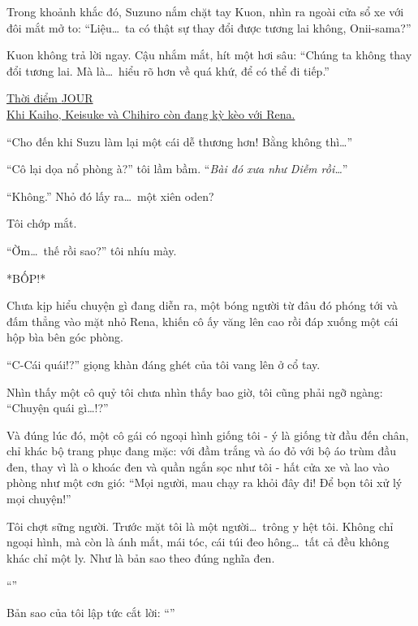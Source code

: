 \documentclass[../main.tex]{subfiles}
\begin{document}

Trong khoảnh khắc đó, Suzuno nắm chặt tay Kuon, nhìn ra ngoài cửa sổ xe với đôi mắt mở to: ``Liệu\dots\ ta có thật sự thay đổi được tương lai không, Onii-sama?''

Kuon không trả lời ngay. Cậu nhắm mắt, hít một hơi sâu: ``Chúng ta không thay đổi tương lai. Mà là\dots\ hiểu rõ hơn về quá khứ, để có thể đi tiếp.''

\begin{center}
  \uline{Thời điểm {\flaregothic JOUR }\\ Khi Kaiho, Keisuke và Chihiro còn đang kỳ kèo với Rena.}
\end{center}

``Cho đến khi Suzu làm lại một cái dễ thương hơn! Bằng không thì\dots''

``Cô lại dọa nổ phòng à?'' tôi lầm bầm. ``\textit{Bài đó xưa như Diễm rồi\dots}''

``Không.'' Nhỏ đó lấy ra\dots\ một xiên oden?

Tôi chớp mắt.

``Ờm\dots\ thế rồi sao?'' tôi nhíu mày.

*BỐP!*

Chưa kịp hiểu chuyện gì đang diễn ra, một bóng người từ đâu đó phóng tới và đấm thẳng vào mặt nhỏ Rena, khiến cô ấy văng lên cao rồi đáp xuống một cái hộp bìa bên góc phòng.


``C-Cái quái!?'' giọng khàn đáng ghét của tôi vang lên ở cổ tay.

Nhìn thấy một cô quỷ tôi chưa nhìn thấy bao giờ, tôi cũng phải ngỡ ngàng: ``Chuyện quái gì\dots!?''

Và đúng lúc đó, một cô gái có ngoại hình giống tôi - ý là giống từ đầu đến chân, chỉ khác bộ trang phục đang mặc: với đầm trắng và áo đỏ với bộ áo trùm đầu đen, thay vì là o khoác đen và quần ngắn sọc như tôi - hất cửa xe và lao vào phòng như một cơn gió: ``Mọi người, mau chạy ra khỏi đây đi! Để bọn tôi xử lý mọi chuyện!''

Tôi chợt sững người. Trước mặt tôi là một người\dots\ trông y hệt tôi. Không chỉ ngoại hình, mà còn là ánh mắt, mái tóc, cái túi đeo hông\dots\ tất cả đều không khác chỉ một ly. Như là bản sao theo đúng nghĩa đen.

``''

Bản sao của tôi lập tức cắt lời: ``''
\end{document}
